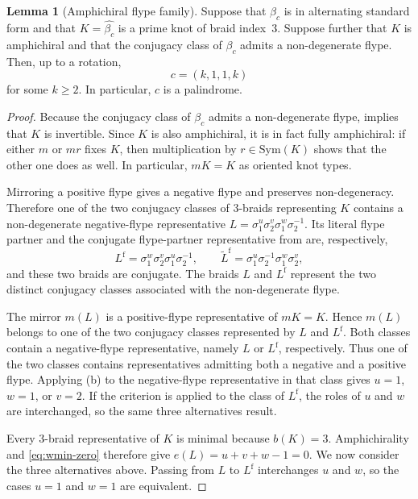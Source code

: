 \documentclass[11pt]{article}
\theoremstyle{definition}
\newtheorem{lemma}[lemma]{Lemma}
\begin{document}
\begin{lemma}[Amphichiral flype family]\label{lem:flype-family}
Suppose that $\beta_c$ is in alternating standard form and that
$K=\widehat{\beta_c}$ is a prime knot of braid index~$3$. Suppose further
that $K$ is amphichiral and that the conjugacy class of $\beta_c$ admits a
non-degenerate flype. Then, up to a rotation,
\[
c=(k,1,1,k)
\]
for some $k\ge2$. In particular, $c$ is a palindrome.
\end{lemma}

\begin{proof}
Because the conjugacy class of $\beta_c$ admits a non-degenerate flype,
 implies that $K$ is invertible. Since $K$ is also
amphichiral, it is in fact fully amphichiral: if either $m$ or $mr$ fixes
$K$, then multiplication by $r\in\mathrm{Sym}(K)$ shows that the other one
does as well. In particular, $mK=K$ as oriented knot types.

Mirroring a positive flype gives a negative flype and preserves
non-degeneracy. Therefore one of the two conjugacy classes of $3$-braids
representing $K$ contains a non-degenerate negative-flype representative
$L=\sigma_1^u\sigma_2^v\sigma_1^w\sigma_2^{-1}$. Its literal flype partner
and the conjugate flype-partner representative from  are,
respectively,
\[
L^{\mathrm f}=\sigma_1^w\sigma_2^v\sigma_1^u\sigma_2^{-1},
\qquad
\widetilde L^{\mathrm f}=\sigma_1^u\sigma_2^{-1}\sigma_1^w\sigma_2^v,
\]
and these two braids are conjugate. The braids $L$ and $L^{\mathrm f}$
represent the two distinct conjugacy classes associated with the
non-degenerate flype.

The mirror $m(L)$ is a positive-flype representative of $mK=K$. Hence
$m(L)$ belongs to one of the two conjugacy classes represented by $L$ and
$L^{\mathrm f}$. Both classes contain a negative-flype representative,
namely $L$ or $L^{\mathrm f}$, respectively. Thus one of the two classes
contains representatives admitting both a negative and a positive flype.
Applying (b) to the negative-flype representative in
that class gives $u=1$, $w=1$, or $v=2$.
If the criterion is applied to the class of $L^{\mathrm f}$, the roles of
$u$ and $w$ are interchanged, so the same three alternatives result.

Every $3$-braid representative of $K$ is minimal because $b(K)=3$.
Amphichirality and \eqref{eq:wmin-zero} therefore give
$e(L)=u+v+w-1=0$. We now consider the three alternatives above. Passing from
$L$ to $L^{\mathrm f}$ interchanges $u$ and $w$, so the cases $u=1$ and
$w=1$ are equivalent.


\end{proof}
\end{document}
